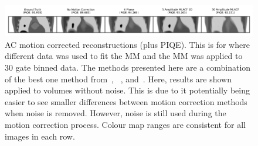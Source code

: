             \begin{figure}
                \centering
                
                \includegraphics[width=1.0\linewidth]{figures/motion_correction_2_results_2_noiseless_best_visual_analysis.png}
                
                \captionsetup{singlelinecheck=false}
                \caption{
                    \gls{AC} motion corrected reconstructions (plus \gls{PIQE}). This is for where different data was used to fit the \gls{MM} and the \gls{MM} was applied to $30$ gate binned data. The methods presented here are a combination of the best one method from~, ~, and~. Here, results are shown applied to volumes without noise. This is due to it potentially being easier to see smaller differences between motion correction methods when noise is removed. However, noise is still used during the motion correction process. Colour map ranges are consistent for all images in each row.
                }
                
                \label{fig:evaluation_of_pet_ct_motion_correction_incorporating_motion_models_using_mlacf_and_complex_gating_schemes_results_noiseless_best_visual_analysis}
            \end{figure}
            
